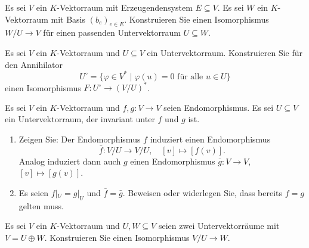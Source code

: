 

\begin{question}[subtitle = Vektorräume als Quotienten freier Vektorräume]{2}
  Es sei $V$ ein $K$-Vektorraum mit Erzeugendensystem $E \subseteq V$.
  Es sei $W$ ein $K$-Vektorraum mit Basis $(b_e)_{e \in E}$.
  Konstruieren Sie einen Isomorphismus $W\!/U \to V$ für einen passenden Untervektorraum $U \subseteq W$.
\end{question}


\begin{question}[subtitle = Annihilatoren als Dualräume von Quotienten]{2}
  Es sei $V$ ein $K$-Vektorraum und $U \subseteq V$ ein Untervektorraum.
  Konstruieren Sie für den Annihilator
  \[
      U^\circ
    = \{ \varphi \in V^* \mid \text{$\varphi(u) = 0$ für alle $u \in U$} \}
  \]
  einen Isomorphismus $F \colon U^\circ \to (V\!/U)^*$.
\end{question}


\begin{question}[subtitle = Induzierte Endomorphismen auf Quotienten]{2}
  Es sei $V$ ein $K$-Vektorraum und $f, g \colon V \to V$ seien Endomorphismus.
  Es sei $U \subseteq V$ ein Untervektorraum, der invariant unter $f$ und $g$ ist.
  \begin{enumerate}[leftmargin=*]
    \item
      Zeigen Sie: Der Endomorphismus $f$ induziert einen Endomorphismus
      \[
        \bar{f} \colon V\!/U \to V\!/U,
        \quad
        [v] \mapsto [f(v)].
      \]
      Analog induziert dann auch $g$ einen Endomorphismus $\bar{g} \colon V \to V$, $[v] \mapsto [g(v)]$.
    \item
      Es seien $f|_U = g|_U$ und $\bar{f} = \bar{g}$.
      Beweisen oder widerlegen Sie, dass bereits $f = g$ gelten muss.
  \end{enumerate}
\end{question}







\begin{question}[subtitle = Herausteilen von direkten Summanden]{3}
  Es sei $V$ ein $K$-Vektorraum und $U, W \subseteq V$ seien zwei Untervektorräume mit $V = U \oplus W$.
  Konstruieren Sie einen Isomorphismus $V\!/U \to W$.
\end{question}



